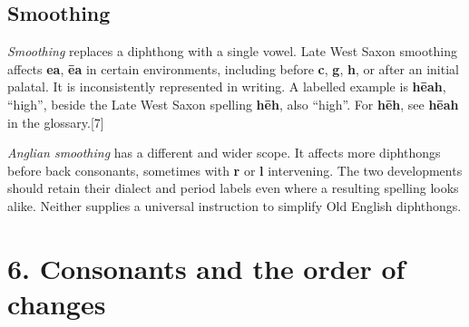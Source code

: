 \subsection*{Smoothing}
\emph{Smoothing} replaces a diphthong with a single vowel. Late West Saxon smoothing affects \textbf{ea}, \textbf{ēa} in certain environments, including before \textbf{c}, \textbf{g}, \textbf{h}, or after an initial palatal. It is inconsistently represented in writing. A labelled example is \textbf{hēah}, “high”, beside the Late West Saxon spelling \textbf{hēh}, also “high”. For \textbf{hēh}, see \textbf{hēah} in the glossary.[7]\par
\emph{Anglian smoothing} has a different and wider scope. It affects more diphthongs before back consonants, sometimes with \textbf{r} or \textbf{l} intervening. The two developments should retain their dialect and period labels even where a resulting spelling looks alike. Neither supplies a universal instruction to simplify Old English diphthongs.\par
\section*{6. Consonants and the order of changes}
